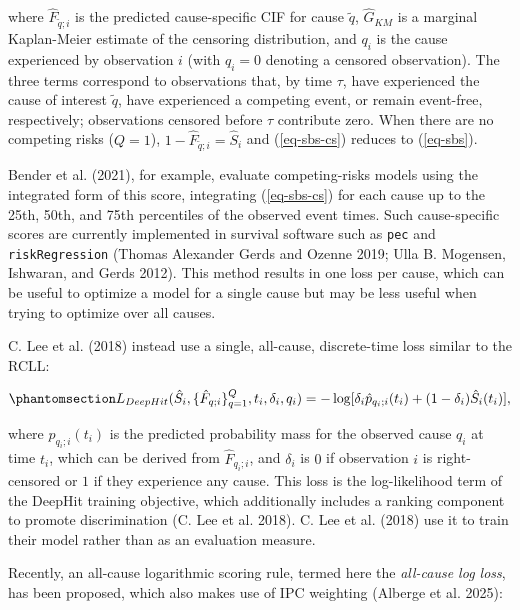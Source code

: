 \documentclass[
  letterpaper,
  krantz2]{style/krantz}
\begin{document}
where \(\hat{F}_{\tilde{q};i}\) is the predicted cause-specific CIF for
cause \(\tilde{q}\), \(\hat{G}_{KM}\) is a marginal Kaplan-Meier
estimate of the censoring distribution, and \(q_i\) is the cause
experienced by observation \(i\) (with \(q_i = 0\) denoting a censored
observation). The three terms correspond to observations that, by time
\(\tau\), have experienced the cause of interest \(\tilde{q}\), have
experienced a competing event, or remain event-free, respectively;
observations censored before \(\tau\) contribute zero. When there are no
competing risks (\(Q = 1\)), \(1 - \hat{F}_{\tilde{q};i} = \hat{S}_i\)
and (\ref{eq-sbs-cs}) reduces to (\ref{eq-sbs}).

Bender et al. (2021), for example, evaluate competing-risks models using
the integrated form of this score, integrating (\ref{eq-sbs-cs}) for
each cause up to the 25th, 50th, and 75th percentiles of the observed
event times. Such cause-specific scores are currently implemented in
survival software such as \texttt{pec} and \texttt{riskRegression}
(Thomas Alexander Gerds and Ozenne 2019; Ulla B. Mogensen, Ishwaran, and
Gerds 2012). This method results in one loss per cause, which can be
useful to optimize a model for a single cause but may be less useful
when trying to optimize over all causes.

C. Lee et al. (2018) instead use a single, all-cause, discrete-time loss
similar to the RCLL:

\begin{equation}\phantomsection\label{eq-ll-deephit}{
L_{DeepHit}(\hat{S}_i, \{\hat{F}_{q;i}\}^Q_{q=1}, t_i, \delta_i, q_i) = -\log[\delta_i\hat{p}_{q_i;i}(t_i) + (1-\delta_i)\hat{S}_i(t_i)],
}\end{equation}

where \(\hat{p}_{q_i;i}(t_i)\) is the predicted probability mass for the
observed cause \(q_i\) at time \(t_i\), which can be derived from
\(\hat{F}_{q_i;i}\), and \(\delta_i\) is \(0\) if observation \(i\) is
right-censored or \(1\) if they experience any cause. This loss is the
log-likelihood term of the DeepHit training objective, which
additionally includes a ranking component to promote discrimination (C.
Lee et al. 2018). C. Lee et al. (2018) use it to train their model
rather than as an evaluation measure.

Recently, an all-cause logarithmic scoring rule, termed here the
\emph{all-cause log loss}, has been proposed, which also makes use of
IPC weighting (Alberge et al. 2025):
\end{document}
